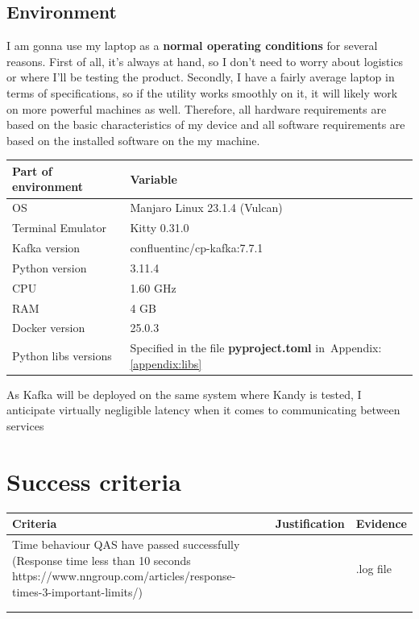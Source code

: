 \documentclass[10pt , a4paper]{report}
\begin{document}
\subsection{Environment}
    I am gonna use my laptop as a \textbf{normal operating conditions} for several reasons. First of all, it's always at hand, so I don't need to worry about logistics or where I'll be testing the product. Secondly, I have a fairly average laptop in terms of specifications, so if the utility works smoothly on it, it will likely work on more powerful machines as well. Therefore, all hardware requirements are based on the basic characteristics of my device and all software requirements are based on the installed software on the my machine.

\begin{table}[h!tbp]
\centering
\begin{tabular}{| l | l |}
\hline
\textbf{Part of environment} & \textbf{Variable} \\
\hline
OS & Manjaro Linux 23.1.4 (Vulcan) \\
\hline
Terminal Emulator & Kitty 0.31.0 \\
\hline
Kafka version & confluentinc/cp-kafka:7.7.1\\
\hline
Python version & 3.11.4 \\
\hline
CPU & 1.60 GHz \\
\hline
RAM & 4 GB \\
\hline
Docker version & 25.0.3 \\
\hline
Python libs versions & Specified in the file \textbf{pyproject.toml} in~Appendix:\ref{appendix:libs} \\
\hline

\end{tabular}

\end{table}
As Kafka will be deployed on the same system where Kandy is tested, I anticipate virtually negligible latency when it comes to communicating between services


\newpage
\section{Success criteria}
\begin{table}[h!tbp]
\centering

\begin{tabular}{|p{7cm}|p{5cm}|p{3cm}|}
\hline
\textbf{Criteria} &  Justification&Evidence \\
\hline
Time behaviour QAS have passed successfully (Response time less than 10 seconds https://www.nngroup.com/articles/response-times-3-important-limits/)&  &.log file \\
\hline
 &   &\\
\hline
 &   &\\
\hline

\end{tabular}

\end{table}
\end{document}
